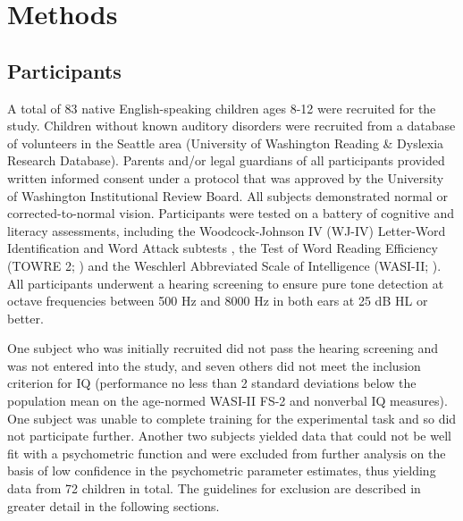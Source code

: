 \documentclass[../uwthesis.tex]{subfiles}
\begin{document}
\section{Methods}
\subsection{Participants}
A total of 83 native English-speaking children ages 8-12 were recruited for the study. Children without known auditory disorders were recruited from a database of volunteers in the Seattle area (University of Washington Reading \& Dyslexia Research Database). Parents and/or legal guardians of all participants provided written informed consent under a protocol that was approved by the University of Washington Institutional Review Board. All subjects demonstrated normal or corrected-to-normal vision. Participants were tested on a battery of cognitive and literacy assessments, including the Woodcock-Johnson IV (WJ-IV) Letter-Word Identification and Word Attack subtests \cite{Schrank2014Woodcock-JohnsonAchievement}, the Test of Word Reading Efficiency (TOWRE 2; \cite{Torgesen2011TOWREEfficiency}) and the Weschlerl Abbreviated Scale of Intelligence (WASI-II; \cite{Wechsler2011WechslerManual.}). All participants underwent a hearing screening to ensure pure tone detection at octave frequencies between 500 Hz and 8000 Hz in both ears at 25 dB HL or better.

One subject who was initially recruited did not pass the hearing screening and was not entered into the study, and seven others did not meet the inclusion criterion for IQ (performance no less than 2 standard deviations below the population mean on the age-normed WASI-II FS-2 and nonverbal IQ measures). One subject was unable to complete training for the experimental task and so did not participate further. Another two subjects yielded data that could not be well fit with a psychometric function and were excluded from further analysis on the basis of low confidence in the psychometric parameter estimates, thus yielding data from 72 children in total. The guidelines for exclusion are described in greater detail in the following sections.
\end{document}
